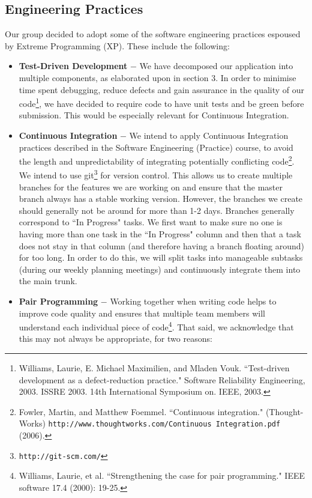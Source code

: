 \documentclass[10pt]{article}
\begin{document}
\subsection{Engineering Practices}
Our group decided to adopt some of the software engineering practices espoused by Extreme Programming (XP). These include the following:
\begin{itemize}
\item \textbf{Test-Driven Development} $-$ We have decomposed our application into multiple components, as elaborated upon in section 3. In order to minimise time spent debugging, reduce defects and gain assurance in the quality of our code\footnote{Williams, Laurie, E. Michael Maximilien, and Mladen Vouk. ``Test-driven development as a defect-reduction practice." Software Reliability Engineering, 2003. ISSRE 2003. 14th International Symposium on. IEEE, 2003.}, we have decided to require code to have unit tests and be green before submission. This would be especially relevant for Continuous Integration.
\item \textbf{Continuous Integration} $-$ We intend to apply Continuous Integration practices described in the Software Engineering (Practice) course, to avoid the length and unpredictability of integrating potentially conflicting code\footnote{Fowler, Martin, and Matthew Foemmel. ``Continuous integration." (Thought-Works) \texttt{http://www.thoughtworks.com/Continuous Integration.pdf} (2006).}. We intend to use git\footnote{\texttt{http://git-scm.com/}} for version control. This allows us to create multiple branches for the features we are working on and ensure that the master branch always has a stable working version. However, the branches we create should generally not be around for more than 1-2 days. Branches generally correspond to ``In Progress" tasks. We first want to make sure no one is having more than one task in the ``In Progress" column and then that a task does not stay in that column (and therefore having a branch floating around) for too long. In order to do this, we will split tasks into manageable subtasks (during our weekly planning meetings) and continuously integrate them into the main trunk. 
\item \textbf{Pair Programming} $-$ Working together when writing code helps to improve code quality and ensures that multiple team members will understand each individual piece of code\footnote{Williams, Laurie, et al. ``Strengthening the case for pair programming." IEEE software 17.4 (2000): 19-25.}. That said, we acknowledge that this may not always be appropriate, for two reasons: \begin{itemize}

\end{itemize}
\end{itemize}
\end{document}
